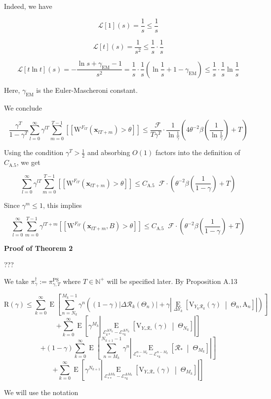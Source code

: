 \documentclass[a4paper]{article}
\newcommand{\Co}[1]{}
\newcommand{\AP}[1]{\left(#1\right)}
\newcommand{\AB}[1]{\left[#1\right]}
\newcommand{\ABM}[2]{\left[#1\;\middle\vert\;#2\right]}
\newcommand{\Abs}[1]{\left\vert #1 \right\vert}
\newcommand{\E}[1]{\operatorname{E}\AB{#1}}
\newcommand{\CE}[3]{\underset{#1}{\operatorname{E}}\ABM{#2}{#3}}
\newcommand{\Nats}{\mathbb{N}}
\newcommand{\R}{\mathcal{R}}
\DeclareMathOperator{\RVO}{\dim_{RVO}}
\newcommand{\V}{\mathrm{V}}
\newcommand{\Reg}{\mathrm{R}}
\newcommand{\PSR}{\text{PS}}
\newcommand{\THy}{Y_*}
\newcommand{\SHy}{Y}
\newcommand{\AT}{\mathrm{A}}
\newcommand{\Ev}{\mathcal{E}}
\newcommand{\ET}{N}
\newcommand{\IT}{M}
\newcommand{\F}{\mathcal{F}}
\newcommand{\W}{\mathrm{W}}
\begin{document}
Indeed, we have

$$\mathcal{L}[1](s) = \frac{1}{s} \leq \frac{1}{s}$$

$$\mathcal{L}[t](s) = \frac{1}{s^2} \leq \frac{1}{s}\cdot\frac{1}{s}$$

$$\mathcal{L}[t\ln{t}](s) = -\frac{\ln{s}+\gamma_{\text{EM}}-1}{s^2}=\frac{1}{s}\cdot \frac{1}{s}\AP{\ln{\frac{1}{s}}+1-\gamma_{\text{EM}}}\leq\frac{1}{s}\cdot \frac{1}{s}\ln{\frac{1}{s}}$$

Here, $\gamma_{\text{EM}}$ is the Euler-Mascheroni constant.

We conclude

$$\frac{\gamma^T}{1-\gamma^T}\sum_{l=0}^{\infty}\gamma^{lT}\sum_{m=0}^{T-1}{[[\W^{F_{lT}}\AP{\boldsymbol{x}_{lT+m}}>\theta]]} \leq \frac{\RVO{\F}}{T\gamma^T}\cdot\frac{1}{\ln{\frac{1}{\gamma}}}\AP{4\theta^{-2}\beta\AP{\frac{1}{\ln\frac{1}{\gamma}}}+T}$$

Using the condition $\gamma^T>\frac{1}{2}$ and absorbing $O(1)$ factors into the definition of $C_{\text{A.5}}$, we get

$$\sum_{l=0}^{\infty}\gamma^{lT}\sum_{m=0}^{T-1}{[[\W^{F_{lT}}\AP{\boldsymbol{x}_{lT+m}}>\theta]]} \leq C_{\text{A.5}}\RVO{\F}\cdot\AP{\theta^{-2}\beta\AP{\frac{1}{1-\gamma}}+T}$$

Since $\gamma^m\leq1$, this implies

$$\sum_{l=0}^\infty\sum_{m=0}^{T-1}{\gamma^{lT+m}[[\W^{F_{lT}}\AP{\boldsymbol{x}_{lT+m},B}>\theta]]} \leq C_{\mathrm{A.5}}\RVO{\F}\cdot\AP{\theta^{-2}\beta\AP{\frac{1}{1-\gamma}}+T}$$

\textbf{Proof of Theorem 2}\Co{b}

???

We take $\pi^\dagger_\gamma:=\pi^\PSR_{\gamma,T}$ where $T\in\Nats^+$ will be specified later. By Proposition A.13

$$\Reg(\gamma)\leq\sum_{k=0}^\infty\E{\sum_{n=\ET_k}^{\IT_k-1}\gamma^{n}\AP{(1-\gamma)\Abs{\Delta\R_k\AP{\Theta_n}}+\gamma\Abs{\CE{\Delta\SHy_k}{\V_{\SHy_k\R_k}(\gamma)}{\Theta_n,\AT_n}}}}$$
$$+\sum_{k=0}^\infty\E{{\gamma^{\IT_k}}\Abs{\CE{\Ev_{k*}^{\Delta\ET_k}-\Ev_{*k}^{\Delta\ET_k}}{\V_{\SHy_*\R_*}(\gamma)}{\Theta_{\ET_k}}}}$$
$$+(1-\gamma)\sum_{k=0}^\infty\E{\sum_{n=\IT_k}^{\ET_{k+1}-1}\gamma^n\Abs{\CE{\Ev_{**}^{n-\IT_k}-\Ev_{*k}^{n-\IT_k}}{\R_*}{\Theta_{\IT_k}}}}$$
$$+\sum_{k=0}^\infty\E{\gamma^{\ET_{k+1}}\Abs{\CE{\Ev_{**}^{\Delta\IT_k}-\Ev_{*k}^{\Delta\IT_k}}{\V_{\THy\R_*}(\gamma)}{\Theta_{\IT_k}}}}$$

We will use the notation
\end{document}
